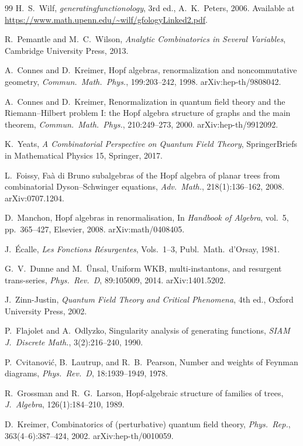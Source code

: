 \documentclass[11pt,a4paper]{article}
\theoremstyle{definition}
\begin{document}
\begin{thebibliography}{99}
H.\ S.\ Wilf,
\newblock \emph{generatingfunctionology},
\newblock 3rd ed., A.\ K.\ Peters, 2006.
\newblock Available at \url{https://www.math.upenn.edu/~wilf/gfologyLinked2.pdf}.

R.\ Pemantle and M.\ C.\ Wilson,
\newblock \emph{Analytic Combinatorics in Several Variables},
\newblock Cambridge University Press, 2013.

A.\ Connes and D.\ Kreimer,
\newblock Hopf algebras, renormalization and noncommutative geometry,
\newblock \emph{Commun.\ Math.\ Phys.}, 199:203--242, 1998.
\newblock arXiv:hep-th/9808042.

A.\ Connes and D.\ Kreimer,
\newblock Renormalization in quantum field theory and the {Riemann}--{Hilbert}
  problem {I}: the {Hopf} algebra structure of graphs and the main theorem,
\newblock \emph{Commun.\ Math.\ Phys.}, 210:249--273, 2000.
\newblock arXiv:hep-th/9912092.

K.\ Yeats,
\newblock \emph{A Combinatorial Perspective on Quantum Field Theory},
\newblock SpringerBriefs in Mathematical Physics 15, Springer, 2017.

L.\ Foissy,
\newblock Fa\`a di Bruno subalgebras of the {Hopf} algebra of planar trees
  from combinatorial {Dyson}--{Schwinger} equations,
\newblock \emph{Adv.\ Math.}, 218(1):136--162, 2008.
\newblock arXiv:0707.1204.

D.\ Manchon,
\newblock Hopf algebras in renormalisation,
\newblock In \emph{Handbook of Algebra}, vol.\ 5, pp.\ 365--427,
  Elsevier, 2008.
\newblock arXiv:math/0408405.

J.\ \'Ecalle,
\newblock \emph{Les Fonctions R\'esurgentes}, Vols.\ 1--3,
\newblock Publ.\ Math.\ d'Orsay, 1981.

G.\ V.\ Dunne and M.\ \"Unsal,
\newblock Uniform {WKB}, multi-instantons, and resurgent trans-series,
\newblock \emph{Phys.\ Rev.\ D}, 89:105009, 2014.
\newblock arXiv:1401.5202.

J.\ Zinn-Justin,
\newblock \emph{Quantum Field Theory and Critical Phenomena},
\newblock 4th ed., Oxford University Press, 2002.

P.\ Flajolet and A.\ Odlyzko,
\newblock Singularity analysis of generating functions,
\newblock \emph{SIAM J.\ Discrete Math.}, 3(2):216--240, 1990.

P.\ Cvitanovi\'c, B.\ Lautrup, and R.\ B.\ Pearson,
\newblock Number and weights of {Feynman} diagrams,
\newblock \emph{Phys.\ Rev.\ D}, 18:1939--1949, 1978.

R.\ Grossman and R.\ G.\ Larson,
\newblock Hopf-algebraic structure of families of trees,
\newblock \emph{J.\ Algebra}, 126(1):184--210, 1989.

D.\ Kreimer,
\newblock Combinatorics of (perturbative) quantum field theory,
\newblock \emph{Phys.\ Rep.}, 363(4--6):387--424, 2002.
\newblock arXiv:hep-th/0010059.

\end{thebibliography}
\end{document}
